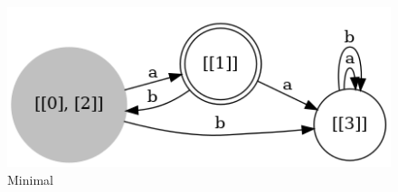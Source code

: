 \documentclass[]{article}
\begin{document}
\begin{enumerate}
        \begin{figure}[htbp]
                  \centering
                  \includegraphics[width=15cm]{automateMinimal.png}
                  \caption{Minimal}\label{fig:3.1}
        \end{figure}\\
    \end{enumerate}
    \setcounter{section}{0}
\end{document}
